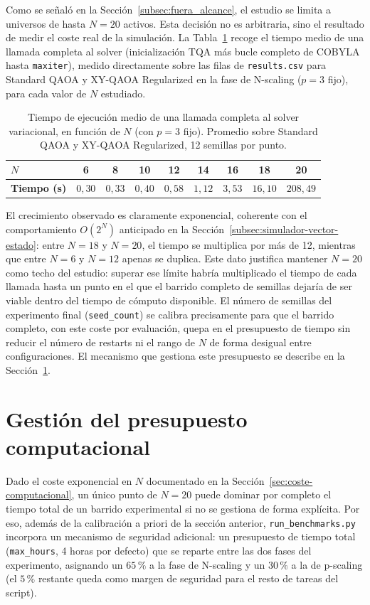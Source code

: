 Como se señaló en la Sección~\ref{subsec:fuera_alcance}, el estudio se limita a universos de hasta $N=20$ activos. Esta decisión no es arbitraria, sino el resultado de medir el coste real de la simulación. La Tabla~\ref{tab:tiempos-N} recoge el tiempo medio de una llamada completa al solver (inicialización TQA más bucle completo de COBYLA hasta \texttt{maxiter}), medido directamente sobre las filas de \texttt{results.csv} para Standard QAOA y XY-QAOA Regularized en la fase de N-scaling ($p=3$ fijo), para cada valor de $N$ estudiado.

\begin{table}[htbp]
\centering
\caption{Tiempo de ejecución medio de una llamada completa al solver variacional, en función de $N$ (con $p=3$ fijo). Promedio sobre Standard QAOA y XY-QAOA Regularized, 12 semillas por punto.}
\label{tab:tiempos-N}
\begin{tabular}{lcccccccc}
\toprule
\textbf{$N$} & 6 & 8 & 10 & 12 & 14 & 16 & 18 & 20 \\
\midrule
\textbf{Tiempo (s)} & $0{,}30$ & $0{,}33$ & $0{,}40$ & $0{,}58$ & $1{,}12$ & $3{,}53$ & $16{,}10$ & $208{,}49$ \\
\bottomrule
\end{tabular}
\end{table}

El crecimiento observado es claramente exponencial, coherente con el comportamiento $O(2^N)$ anticipado en la Sección~\ref{subsec:simulador-vector-estado}: entre $N=18$ y $N=20$, el tiempo se multiplica por más de 12, mientras que entre $N=6$ y $N=12$ apenas se duplica. Este dato justifica mantener $N=20$ como techo del estudio: superar ese límite habría multiplicado el tiempo de cada llamada hasta un punto en el que el barrido completo de semillas dejaría de ser viable dentro del tiempo de cómputo disponible. El número de semillas del experimento final (\texttt{seed\_count}) se calibra precisamente para que el barrido completo, con este coste por evaluación, quepa en el presupuesto de tiempo sin reducir el número de restarts ni el rango de $N$ de forma desigual entre configuraciones. El mecanismo que gestiona este presupuesto se describe en la Sección~\ref{sec:presupuesto-computo}.

\section{Gestión del presupuesto computacional}
\label{sec:presupuesto-computo}

Dado el coste exponencial en $N$ documentado en la Sección~\ref{sec:coste-computacional}, un único punto de $N=20$ puede dominar por completo el tiempo total de un barrido experimental si no se gestiona de forma explícita. Por eso, además de la calibración a priori de la sección anterior, \texttt{run\_benchmarks.py} incorpora un mecanismo de seguridad adicional: un presupuesto de tiempo total (\texttt{max\_hours}, 4 horas por defecto) que se reparte entre las dos fases del experimento, asignando un $65\,\%$ a la fase de N-scaling y un $30\,\%$ a la de p-scaling (el $5\,\%$ restante queda como margen de seguridad para el resto de tareas del script).

